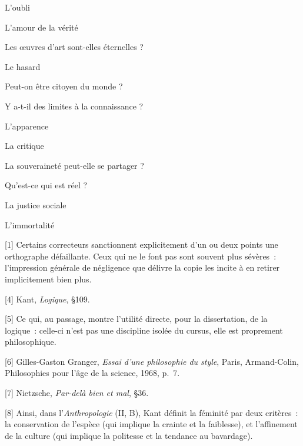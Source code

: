 \documentclass[a4paper,12pt]{article}
\begin{document}
\begin{multicols}{2}
\noindent L’oubli \par
\noindent L’amour de la vérité \par
\noindent Les œuvres d’art sont-elles éternelles ? \par
\noindent Le hasard \par
\noindent Peut-on être citoyen du monde ? \par
\noindent Y a-t-il des limites à la connaissance ? \par
\noindent L’apparence \par
\noindent La critique \par
\noindent La souveraineté peut-elle se partager ? \par
\noindent Qu’est-ce qui est réel ? \par
\noindent La justice sociale \par
\noindent L’immortalité \par
\end{multicols}

[1] Certains correcteurs sanctionnent explicitement d'un ou deux points
    une orthographe défaillante. Ceux qui ne le font pas sont souvent
    plus sévères : l'impression générale de négligence que délivre la
    copie les incite à en retirer implicitement bien plus.

[4] Kant, \emph{Logique}, §109.

[5] Ce qui, au passage, montre l'utilité directe, pour la dissertation,
    de la logique : celle-ci n'est pas une discipline isolée du cursus,
    elle est proprement philosophique.

[6] Gilles-Gaston Granger, \emph{Essai d'une philosophie du style}, Paris,
    Armand-Colin, Philosophies pour l'âge de la science, 1968, p. 7.

[7] Nietzsche, \emph{Par-delà bien et mal}, §36.

[8] Ainsi, dans l'\emph{Anthropologie} (II, B), Kant définit la féminité par
    deux critères : la conservation de l'espèce (qui implique la crainte
    et la faiblesse), et l'affinement de la culture (qui implique la
    politesse et la tendance au bavardage).
\end{document}
